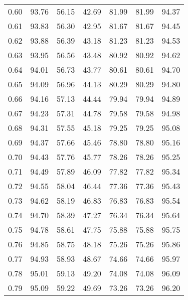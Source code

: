 \begin{tabular}{|c|c|c|c|c|c|c|}
      0.60 &     93.76 &     56.15 &      42.69 &   81.99 &      81.99 &         94.37 \\
      0.61 &     93.83 &     56.30 &      42.95 &   81.67 &      81.67 &         94.45 \\
      0.62 &     93.88 &     56.39 &      43.18 &   81.23 &      81.23 &         94.53 \\
      0.63 &     93.95 &     56.56 &      43.48 &   80.92 &      80.92 &         94.62 \\
      0.64 &     94.01 &     56.73 &      43.77 &   80.61 &      80.61 &         94.70 \\
      0.65 &     94.09 &     56.96 &      44.13 &   80.29 &      80.29 &         94.80 \\
      0.66 &     94.16 &     57.13 &      44.44 &   79.94 &      79.94 &         94.89 \\
      0.67 &     94.23 &     57.31 &      44.78 &   79.58 &      79.58 &         94.98 \\
      0.68 &     94.31 &     57.55 &      45.18 &   79.25 &      79.25 &         95.08 \\
      0.69 &     94.37 &     57.66 &      45.46 &   78.80 &      78.80 &         95.16 \\
      0.70 &     94.43 &     57.76 &      45.77 &   78.26 &      78.26 &         95.25 \\
      0.71 &     94.49 &     57.89 &      46.09 &   77.82 &      77.82 &         95.34 \\
      0.72 &     94.55 &     58.04 &      46.44 &   77.36 &      77.36 &         95.43 \\
      0.73 &     94.62 &     58.19 &      46.83 &   76.83 &      76.83 &         95.54 \\
      0.74 &     94.70 &     58.39 &      47.27 &   76.34 &      76.34 &         95.64 \\
      0.75 &     94.78 &     58.61 &      47.75 &   75.88 &      75.88 &         95.75 \\
      0.76 &     94.85 &     58.75 &      48.18 &   75.26 &      75.26 &         95.86 \\
      0.77 &     94.93 &     58.93 &      48.67 &   74.66 &      74.66 &         95.97 \\
      0.78 &     95.01 &     59.13 &      49.20 &   74.08 &      74.08 &         96.09 \\
      0.79 &     95.09 &     59.22 &      49.69 &   73.26 &      73.26 &         96.20 \\

\end{tabular}

